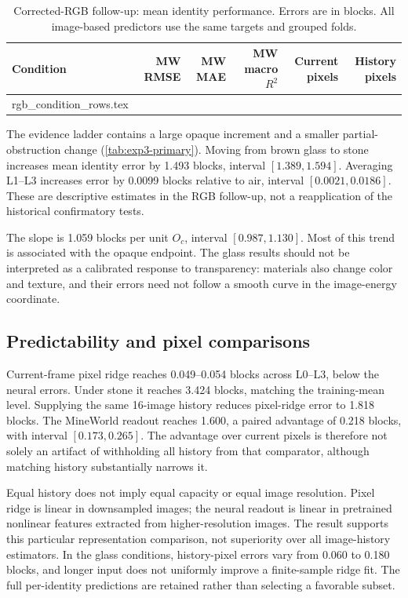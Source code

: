 \documentclass{article}
\makeatletter
\let\tablerows\@@input
\makeatother
\begin{document}
\begin{table}[!htbp]
  \caption{Corrected-RGB follow-up: mean identity performance. Errors are in blocks. All image-based predictors use the same targets and grouped folds.}
  \label{tab:exp3-condition}
  \centering
  \small
  \setlength{\tabcolsep}{5pt}
  \begin{tabular}{@{}lrrrrr@{}}
    \toprule
    Condition & MW RMSE & MW MAE & MW macro $R^2$ & Current pixels & History pixels \\
    \midrule
    \tablerows rgb_condition_rows.tex
    \bottomrule
  \end{tabular}
\end{table}
The evidence ladder contains a large opaque increment and a smaller partial-obstruction change (\autoref{tab:exp3-primary}). Moving from brown glass to stone increases mean identity error by 1.493 blocks, interval $[1.389,1.594]$. Averaging L1--L3 increases error by 0.0099 blocks relative to air, interval $[0.0021,0.0186]$. These are descriptive estimates in the RGB follow-up, not a reapplication of the historical confirmatory tests.

The slope is 1.059 blocks per unit $O_c$, interval $[0.987,1.130]$. Most of this trend is associated with the opaque endpoint. The glass results should not be interpreted as a calibrated response to transparency: materials also change color and texture, and their errors need not follow a smooth curve in the image-energy coordinate.


\subsection{Predictability and pixel comparisons}
\label{sec:baseline-results}
Current-frame pixel ridge reaches 0.049--0.054 blocks across L0--L3, below the neural errors. Under stone it reaches 3.424 blocks, matching the training-mean level. Supplying the same 16-image history reduces pixel-ridge error to 1.818 blocks. The MineWorld readout reaches 1.600, a paired advantage of 0.218 blocks, with interval $[0.173,0.265]$. The advantage over current pixels is therefore not solely an artifact of withholding all history from that comparator, although matching history substantially narrows it.

Equal history does not imply equal capacity or equal image resolution. Pixel ridge is linear in downsampled images; the neural readout is linear in pretrained nonlinear features extracted from higher-resolution images. The result supports this particular representation comparison, not superiority over all image-history estimators. In the glass conditions, history-pixel errors vary from 0.060 to 0.180 blocks, and longer input does not uniformly improve a finite-sample ridge fit. The full per-identity predictions are retained rather than selecting a favorable subset.
\end{document}
